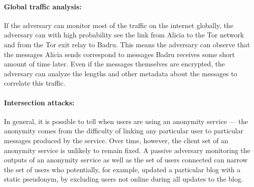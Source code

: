   \paragraph{Global traffic analysis:}
  If the adversary can monitor most of the traffic on the internet globally,
  the adversary can with high probability see the link from Alicia to the Tor
  network and from the Tor exit relay to Badru. This means the adversary can
  observe that the messages Alicia sends correspond to messages Badru receives
  some short amount of time later. Even if the messages themselves are
  encrypted, the adversary can analyze the lengths and other metadata about the
  messages to correlate this traffic.
  \paragraph{Intersection attacks:}
  In general, it is possible to tell when users are using an anonymity
  service --- the anonymity comes from the difficulty of linking any particular
  user to particular messages produced by the service. Over time, however, the
  client set of an anonymity service is unlikely to remain fixed. A passive
  adversary monitoring the outputs of an anonymity service as well as the set
  of users connected can narrow the set of users who potentially, for example,
  updated a particular blog with a static pseudonym, by excluding users  not
  online during all updates to the blog.

